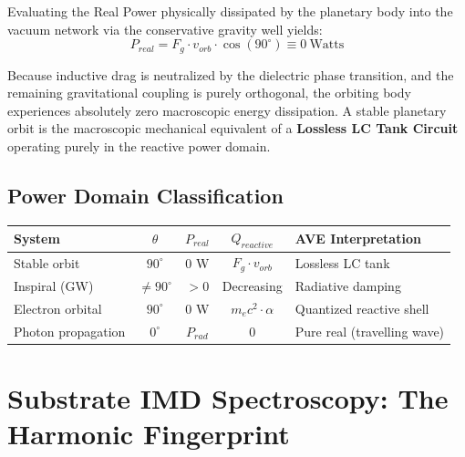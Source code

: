 Evaluating the Real Power physically dissipated by the planetary body into the vacuum
network via the conservative gravity well yields:
\begin{equation}
P_{real} = F_g \cdot v_{orb} \cdot \cos(90^\circ) \equiv 0\ \text{Watts}
\end{equation}

Because inductive drag is neutralized by the dielectric phase transition, and the remaining
gravitational coupling is purely orthogonal, the orbiting body experiences absolutely zero
macroscopic energy dissipation. A stable planetary orbit is the macroscopic mechanical
equivalent of a \textbf{Lossless LC Tank Circuit} operating purely in the reactive power domain.

\subsection*{Power Domain Classification}
\begin{center}
\small
\renewcommand{\arraystretch}{1.2}
\begin{tabularx}{\textwidth}{@{}lcccX@{}}
\toprule
\textbf{System} & \textbf{$\theta$} & \textbf{$P_{real}$} & \textbf{$Q_{reactive}$} & \textbf{AVE Interpretation} \\
\midrule
Stable orbit     & $90^\circ$ & $0$ W & $F_g \cdot v_{orb}$ & Lossless LC tank \\
Inspiral (GW)    & $\neq 90^\circ$ & $> 0$ & Decreasing & Radiative damping \\
Electron orbital & $90^\circ$ & $0$ W & $m_e c^2 \cdot \alpha$ & Quantized reactive shell \\
Photon propagation & $0^\circ$ & $P_{rad}$ & $0$ & Pure real (travelling wave) \\
\bottomrule
\end{tabularx}
\end{center}\section{Substrate IMD Spectroscopy: The Harmonic Fingerprint}
\label{sec:imd}

